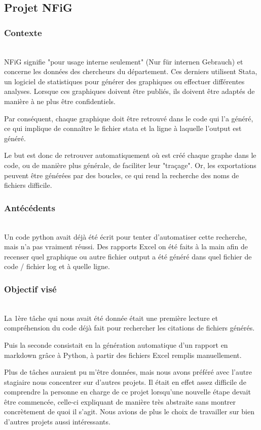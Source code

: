 \subsection{Projet NFiG}

\subsubsection{Contexte}
~\\
NFiG signifie "pour usage interne seulement" (Nur für internen Gebrauch) et concerne les données des chercheurs du département. 
Ces derniers utilisent Stata, un logiciel de statistiques pour générer des graphiques ou effectuer différentes analyses.
Lorsque ces graphiques doivent être publiés, ils doivent être adaptés de manière à ne plus être confidentiels.

Par conséquent, chaque graphique doit être retrouvé dans le code qui l'a généré, ce qui implique de connaître le fichier stata et la ligne à laquelle l'output est généré.

Le but est donc de retrouver automatiquement où est créé chaque graphe dans le code, ou de manière plus générale, de faciliter leur "traçage".
Or, les exportations peuvent être générées par des boucles, ce qui rend la recherche des noms de fichiers difficile.

\subsubsection{Antécédents}
~\\
Un code python avait déjà été écrit pour tenter d'automatiser cette recherche, mais n'a pas vraiment réussi.
Des rapports Excel on été faits à la main afin de recenser quel graphique ou autre fichier output a été généré dans quel fichier de code / fichier log et à quelle ligne. 

\subsubsection{Objectif visé}
~\\ 
La 1ère tâche qui nous avait été donnée était une première lecture et compréhension du code déjà fait pour rechercher les citations de fichiers générés.

Puis la seconde consistait en la génération automatique d'un rapport en markdown grâce à Python, à partir des fichiers Excel remplis manuellement.

Plus de tâches auraient pu m'être données, mais nous avons préféré avec l'autre stagiaire nous concentrer sur d'autres projets. 
Il était en effet assez difficile de comprendre la personne en charge de ce projet lorsqu'une nouvelle étape devait être commencée, celle-ci expliquant de manière très abstraite sans montrer concrètement de quoi il s'agit.
Nous avions de plus le choix de travailler sur bien d'autres projets aussi intéressants.

